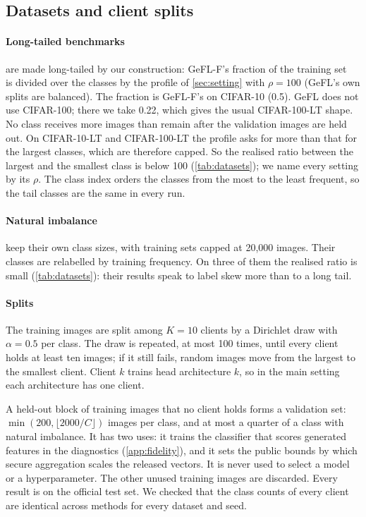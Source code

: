 \subsection{Datasets and client splits}\label{sec:setup-data}

\paragraph{Long-tailed benchmarks}  are made long-tailed by our construction: GeFL-F's
fraction of the training set~\cite{kang2025gefl} is divided over the classes by the profile of \cref{sec:setting}
with $\rho=100$ (GeFL's own splits are balanced). The fraction is GeFL-F's on CIFAR-10
(0.5). GeFL does not use CIFAR-100; there we take 0.22, which gives the usual CIFAR-100-LT shape. No class receives more
images than remain after the validation images are held out. On CIFAR-10-LT and CIFAR-100-LT the profile asks for more
than that for the largest classes, which are therefore capped. So the realised ratio between the largest and the
smallest class is below 100 (\cref{tab:datasets}); we name every setting by its $\rho$. The class index orders the
classes from the most to the least frequent, so the tail classes are the same in every run.

\paragraph{Natural imbalance}  keep their own class sizes, with training sets capped at 20,000
images. Their classes are relabelled by training frequency. On three of them the realised ratio is small
(\cref{tab:datasets}): their results speak to label skew more than to a long tail.

\paragraph{Splits} The training images are split among $K=10$ clients by a Dirichlet draw with $\alpha=0.5$ per
class. The draw is repeated, at most 100 times, until every client holds at least ten images; if it still fails, random
images move from the largest to the smallest client. Client $k$ trains head architecture $k$, so
in the main setting each architecture has one client.

A held-out block of training images that no client holds forms a validation set: $\min(200,\lfloor 2000/C\rfloor)$
images per class, and at most a quarter of a class with natural imbalance. It has two uses: it trains the classifier
that scores generated features in the diagnostics (\cref{app:fidelity}), and it sets the public bounds by which secure aggregation scales the
released vectors. It is never used to select a model or a hyperparameter. The other unused training images are
discarded. Every result is on the official test set. We checked that the class counts of every client are identical across methods for every dataset and seed.

